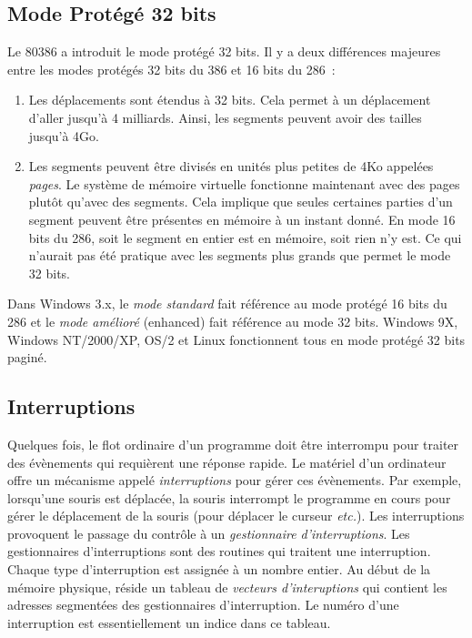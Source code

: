 \subsection{Mode Protégé 32 bits}

Le 80386 a introduit le mode protégé 32 bits. Il y a deux différences majeures
entre les modes protégés 32 bits du 386 et 16 bits du 286~:
\begin{enumerate}
\item

Les déplacements sont étendus à 32 bits. Cela permet à un déplacement
d'aller jusqu'à 4 milliards. Ainsi, les segments peuvent avoir des
tailles jusqu'à 4Go.

\item

Les segments peuvent être divisés en unités plus petites de 4Ko appelées
\emph{pages}. Le système de mémoire virtuelle fonctionne maintenant avec
des pages plutôt qu'avec des segments. Cela implique que seules certaines
parties d'un segment peuvent être présentes en mémoire à un instant donné.
En mode 16 bits du 286, soit le segment en entier est en mémoire, soit rien
n'y est. Ce qui n'aurait pas été pratique avec les segments plus grands que permet
le mode 32 bits.

\end{enumerate}


Dans Windows 3.x, le \emph{mode standard} fait référence au mode protégé
16 bits du 286 et le \emph{mode amélioré} (enhanced) fait référence au mode
32 bits. Windows 9X, Windows NT/2000/XP, OS/2 et Linux fonctionnent tous en
mode protégé 32 bits paginé.

\subsection{Interruptions}

Quelques fois, le flot ordinaire d'un programme doit être interrompu pour traiter
des évènements qui requièrent une réponse rapide. Le matériel d'un ordinateur
offre un mécanisme appelé \emph{interruptions} pour gérer ces évènements. Par
exemple, lorsqu'une souris est déplacée, la souris interrompt le programme en
cours pour gérer le déplacement de la souris (pour déplacer le curseur {\em etc.\/}).
Les interruptions provoquent le passage du contrôle à un \emph{gestionnaire d'interruptions}.
Les gestionnaires d'interruptions sont des routines qui traitent une interruption.
Chaque type d'interruption est assignée à un nombre entier. Au début de la mémoire
physique, réside un tableau de \emph{vecteurs d'interuptions} qui contient
les adresses segmentées des gestionnaires d'interruption. Le numéro d'une interruption
est essentiellement un indice dans ce tableau.

